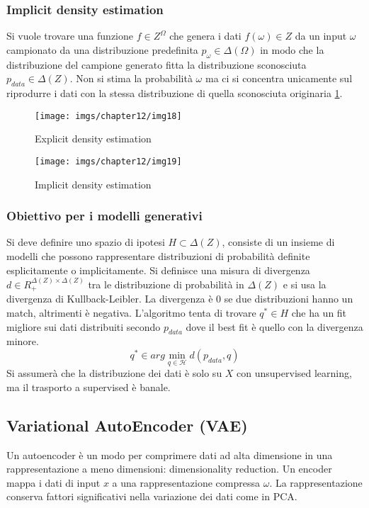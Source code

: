 		\subsubsection{Implicit density estimation}
		Si vuole trovare una funzione $f\in Z^\Omega$ che genera i dati $f(\omega)\in Z$ da un input $\omega$ campionato da una distribuzione predefinita $p_\omega\in\Delta(\Omega)$ in modo che la distribuzione del campione generato fitta la distribuzione sconosciuta $p_{data}\in\Delta(Z)$.
		Non si stima la probabilit\`a $\omega$ ma ci si concentra unicamente sul riprodurre i dati con la stessa distribuzione di quella sconosciuta originaria \ref{fig:chapter12-19}.
		
		\begin{figure}
			\centering
			\begin{minipage}{.5\textwidth}
				\centering
				\texttt{[image: imgs/chapter12/img18]}
				\caption{Explicit density estimation}
				\label{fig:chapter12-18}
			\end{minipage}%
			\begin{minipage}{.5\textwidth}
				\centering
				\texttt{[image: imgs/chapter12/img19]}
				\caption{Implicit density estimation}
				\label{fig:chapter12-19}
			\end{minipage}
		\end{figure}
		
		
		\subsubsection{Obiettivo per i modelli generativi}
		Si deve definire uno spazio di ipotesi $H\subset \Delta(Z)$, consiste di un insieme di modelli che possono rappresentare distribuzioni di probabilit\`a definite esplicitamente o implicitamente.
		Si definisce una misura di divergenza $d\in R_+^{\Delta(Z)\times\Delta(Z)}$ tra le distribuzione di probabilit\`a in $\Delta(Z)$ e si usa la divergenza di Kullback-Leibler.
		La divergenza \`e $0$ se due distribuzioni hanno un match, altrimenti \`e negativa.
		L'algoritmo tenta di trovare $q^*\in H$ che ha un fit migliore sui dati distribuiti secondo $p_{data}$ dove il best fit \`e quello con la divergenza minore.
		$$q^*\in arg\min\limits_{q\in\mathcal{H}}d(p_{data},q)$$
		Si assumer\`a che la distribuzione dei dati \`e solo su $X$ con unsupervised learning, ma il trasporto a supervised \`e banale.

	\subsection{Variational AutoEncoder (VAE)}
	Un autoencoder \`e un modo per comprimere dati ad alta dimensione in una rappresentazione a meno dimensioni: dimensionality reduction.
	Un encoder mappa i dati di input $x$ a una rappresentazione compressa $\omega$.
	La rappresentazione conserva fattori significativi nella variazione dei dati come in PCA.

